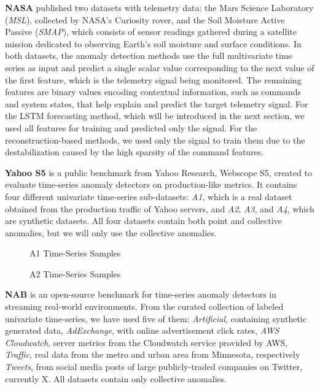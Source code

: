 \textbf{NASA} published two datasets with telemetry data: the Mars Science Laboratory (\textit{MSL}), collected by NASA’s Curiosity rover, and the Soil Moisture Active Passive (\textit{SMAP}), which consists of sensor readings gathered during a satellite mission dedicated to observing Earth’s soil moisture and surface conditions. In both datasets, the anomaly detection methods use the full multivariate time series as input and predict a single scalar value corresponding to the next value of the first feature, which is the telemetry signal being monitored. The remaining features are binary values encoding contextual information, such as commands and system states, that help explain and predict the target telemetry signal. For the LSTM forecasting method, which will be introduced in the next section, we used all features for training and predicted only the signal. For the reconstruction-based methods, we used only the signal to train them due to the destabilization caused by the high sparsity of the command features.

\textbf{Yahoo S5} is a public benchmark from Yahoo Research, Webscope S5, created to evaluate time-series anomaly detectors on production-like metrics. It contains four different univariate time-series sub-datasets: \textit{A1}, which is a real dataset obtained from the production traffic of Yahoo servers, and \textit{A2}, \textit{A3}, and \textit{A4}, which are synthetic datasets. All four datasets contain both point and collective anomalies, but we will only use the collective anomalies. 

\begin{figure}[H]
  \centering
  \hfill
  \hfill
  
  \caption{\small A1 Time-Series Samples}
\end{figure}

\begin{figure}[H]
    \hfill
    \hfill
    \hfill
    \caption{\small A2 Time-Series Samples}
\end{figure}

\textbf{NAB} \cite{lavin2015nab-dataset} is an open-source benchmark for time-series anomaly detectors in streaming real-world environments. From the curated collection of labeled univariate time-series, we have used five of them: \textit{Artificial}, containing synthetic generated data, \textit{AdExchange}, with online advertisement click rates, \textit{AWS Cloudwatch}, server metrics from the Cloudwatch service provided by AWS, \textit{Traffic}, real data from the metro and urban area from Minnesota, respectively \textit{Tweets}, from social media posts of large publicly-traded companies on Twitter, currently X. All datasets contain only collective anomalies.

